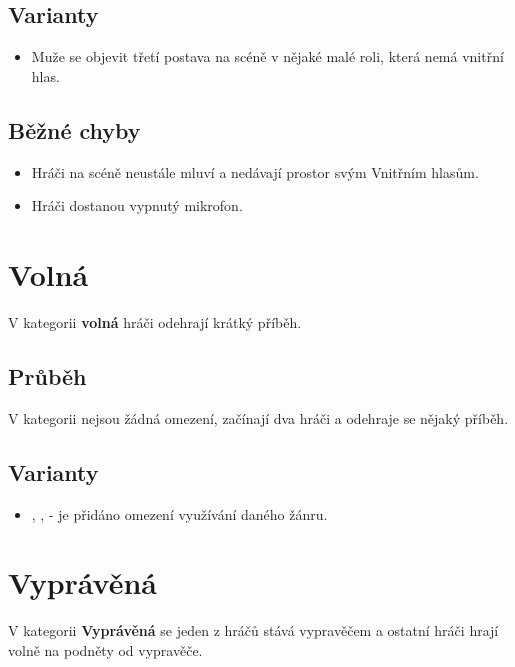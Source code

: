 \documentclass[main.tex]{subfiles}
\begin{document}
\subsection{ Varianty } \begin{itemize}
\item Muže se objevit třetí postava na scéně v nějaké malé roli, která nemá vnitřní hlas.
\end{itemize}
 
\subsection{ Běžné chyby } \begin{itemize}
\item Hráči na scéně neustále mluví a nedávají prostor svým Vnitřním hlasům.
\item Hráči dostanou vypnutý mikrofon.
\end{itemize}
 
 
 
 
\needspace{5cm} \section{Volná} \label{volná}  
V kategorii \textbf{volná}{}  hráči odehrají krátký příběh. 
 
\subsection{Průběh} V kategorii nejsou žádná omezení, začínají dva hráči a odehraje se nějaký příběh. 
 
\subsection{Varianty} \begin{itemize}
\item {}, ,  - je přidáno omezení využívání daného žánru.
\end{itemize}
 
 
 
\needspace{5cm} \section{Vyprávěná} \label{vyprávěná}  
 
V kategorii \textbf{Vyprávěná}{} se jeden z hráčů stává vypravěčem a ostatní hráči hrají volně na podněty od vypravěče. 
 
\end{document}
